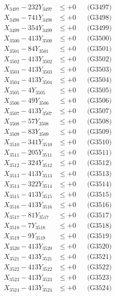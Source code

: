 \documentclass[a4paper,10pt]{article}
\begin{document}
{\begin{align}
X_{3497} - 232Y_{3497} &\leq +0 && \text{(G3497)} \\
X_{3498} - 741Y_{3498} &\leq +0 && \text{(G3498)} \\
X_{3499} - 354Y_{3499} &\leq +0 && \text{(G3499)} \\
X_{3500} - 413Y_{3500} &\leq +0 && \text{(G3500)} \\
\allowbreak
X_{3501} - 84Y_{3501} &\leq +0 && \text{(G3501)} \\
X_{3502} - 413Y_{3502} &\leq +0 && \text{(G3502)} \\
X_{3503} - 413Y_{3503} &\leq +0 && \text{(G3503)} \\
X_{3504} - 413Y_{3504} &\leq +0 && \text{(G3504)} \\
X_{3505} - 4Y_{3505} &\leq +0 && \text{(G3505)} \\
X_{3506} - 49Y_{3506} &\leq +0 && \text{(G3506)} \\
X_{3507} - 413Y_{3507} &\leq +0 && \text{(G3507)} \\
X_{3508} - 57Y_{3508} &\leq +0 && \text{(G3508)} \\
X_{3509} - 83Y_{3509} &\leq +0 && \text{(G3509)} \\
X_{3510} - 341Y_{3510} &\leq +0 && \text{(G3510)} \\
\allowbreak
X_{3511} - 205Y_{3511} &\leq +0 && \text{(G3511)} \\
X_{3512} - 324Y_{3512} &\leq +0 && \text{(G3512)} \\
X_{3513} - 413Y_{3513} &\leq +0 && \text{(G3513)} \\
X_{3514} - 322Y_{3514} &\leq +0 && \text{(G3514)} \\
X_{3515} - 413Y_{3515} &\leq +0 && \text{(G3515)} \\
X_{3516} - 413Y_{3516} &\leq +0 && \text{(G3516)} \\
X_{3517} - 81Y_{3517} &\leq +0 && \text{(G3517)} \\
X_{3518} - 7Y_{3518} &\leq +0 && \text{(G3518)} \\
X_{3519} - 9Y_{3519} &\leq +0 && \text{(G3519)} \\
X_{3520} - 413Y_{3520} &\leq +0 && \text{(G3520)} \\
\allowbreak
X_{3521} - 413Y_{3521} &\leq +0 && \text{(G3521)} \\
X_{3522} - 413Y_{3522} &\leq +0 && \text{(G3522)} \\
X_{3523} - 413Y_{3523} &\leq +0 && \text{(G3523)} \\
X_{3524} - 413Y_{3524} &\leq +0 && \text{(G3524)} \\

\end{align}}
\end{document}
